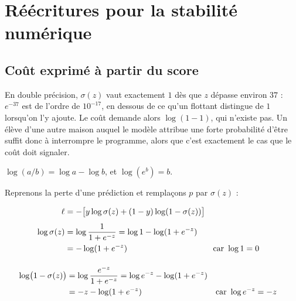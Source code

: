 \chapter{Réécritures pour la stabilité numérique}
\label{ann:stabilite}


\section{Coût exprimé à partir du score}

En double précision, $\sigma(z)$ vaut exactement $1$ dès que $z$ dépasse environ
$37$ : $e^{-37}$ est de l'ordre de $10^{-17}$, en dessous de ce qu'un flottant
distingue de $1$ lorsqu'on l'y ajoute. Le coût demande alors $\log(1-1)$, qui
n'existe pas. Un élève d'une autre maison auquel le modèle attribue une forte
probabilité d'être \Gryf suffit donc à interrompre le programme, alors que
c'est exactement le cas que le coût doit signaler.

\begin{rappel}
$\log(a/b)=\log a-\log b$, et $\log(e^{b})=b$.
\end{rappel}

Reprenons la perte d'une prédiction et remplaçons $p$ par $\sigma(z)$ :

\begin{align}
  \ell &= -\bigl[y\log\sigma(z)+(1-y)\log(1-\sigma(z))\bigr] \notag\\[4pt]
  \log\sigma(z) &= \log\frac{1}{1+e^{-z}}
    = \log 1-\log(1+e^{-z}) \notag\\
    &= -\log(1+e^{-z})
    &&\text{car } \log 1=0 \notag\\[4pt]
\end{align}

\slidebreak

\begin{align}
  \log\bigl(1-\sigma(z)\bigr) &= \log\frac{e^{-z}}{1+e^{-z}}
    = \log e^{-z}-\log(1+e^{-z}) \notag\\
    &= -z-\log(1+e^{-z})
    &&\text{car } \log e^{-z}=-z \notag\\[4pt]
\end{align}

